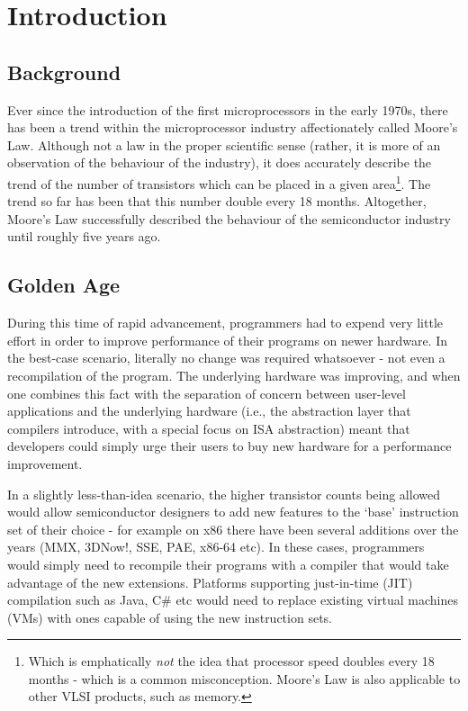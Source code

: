 \chapter{Introduction} \label{chp:introduction}
\section{Background} \label{sec:introduction/background}
Ever since the introduction of the first microprocessors in the early 1970s, there has been a trend within the microprocessor industry affectionately called Moore's Law. Although not a law in the proper scientific sense (rather, it is more of an observation of the behaviour of the industry), it does accurately describe the trend of the number of transistors which can be placed in a given area\footnote{Which is emphatically \textit{not} the idea that processor speed doubles every 18 months - which is a common misconception. Moore's Law is also applicable to other VLSI products, such as memory.}. The trend so far has been that this number double every 18 months. Altogether, Moore's Law successfully described the behaviour of the semiconductor industry until roughly five years ago.

\section{Golden Age} \label{sec:introduction/golden-age}
During this time of rapid advancement, programmers had to expend very little effort in order to improve performance of their programs on newer hardware. In the best-case scenario, literally no change was required whatsoever - not even a recompilation of the program. The underlying hardware was improving, and when one combines this fact with the separation of concern between user-level applications and the underlying hardware (i.e., the abstraction layer that compilers introduce, with a special focus on ISA abstraction) meant that developers could simply urge their users to buy new hardware for a performance improvement.

In a slightly less-than-idea scenario, the higher transistor counts being allowed would allow semiconductor designers to add new features to the `base' instruction set of their choice - for example on x86 there have been several additions over the years (MMX, 3DNow!, SSE, PAE, x86-64 etc). In these cases, programmers would simply need to recompile their programs with a compiler that would take advantage of the new extensions. Platforms supporting just-in-time (JIT) compilation such as Java, C\# etc would need to replace existing virtual machines (VMs) with ones capable of using the new instruction sets.

